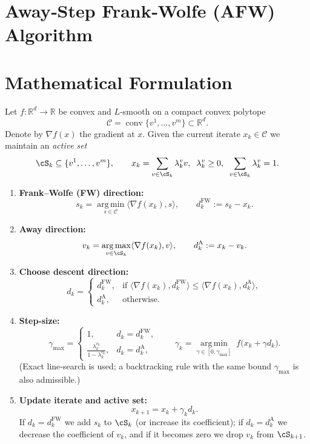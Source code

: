 \documentclass{article}
\newcommand{\R}{\mathbb{R}}
\newcommand{\cC}{\mathcal{C}}
\newcommand{\argmin}{\operatorname*{arg\,min}}
\newcommand{\argmax}{\operatorname*{arg\,max}}
\newcommand{\inner}[2]{\langle #1,#2\rangle}
\begin{document}
\section*{Away‑Step Frank‑Wolfe (AFW) Algorithm}

\section*{Mathematical Formulation}
Let $f:\R^{d}\rightarrow\R$ be convex and $L$‑smooth on a compact convex polytope 
\[
\cC=\operatorname{conv}\{v^{1},\dots ,v^{m}\}\subset\R^{d}.
\]
Denote by $\nabla f(x)$ the gradient at $x$.
Given the current iterate $x_{k}\in\cC$ we maintain an \emph{active set}
\[
\cS_{k}\subseteq\{v^{1},\dots ,v^{m}\},\qquad 
x_{k}= \sum_{v\in \cS_{k}} \lambda_{k}^{v} v,\;\; \lambda_{k}^{v}\ge 0,\;\; \sum_{v\in \cS_{k}}\lambda_{k}^{v}=1 .
\]

\begin{enumerate}[label=\arabic*.]
\item \textbf{Frank–Wolfe (FW) direction:}
\[
s_{k}= \argmin_{s\in\cC}\inner{\nabla f(x_{k})}{s},\qquad d_{k}^{\text{FW}}:= s_{k}-x_{k}.
\]
\item \textbf{Away direction:}
\[
v_{k}= \argmax_{v\in \cS_{k}}\inner{\nabla f(x_{k})}{v},\qquad 
d_{k}^{\text{A}}:= x_{k}-v_{k}.
\]
\item \textbf{Choose descent direction:}
\[
d_{k}= 
\begin{cases}
d_{k}^{\text{FW}}, & \text{if }\inner{\nabla f(x_{k})}{d_{k}^{\text{FW}}}\le 
\inner{\nabla f(x_{k})}{d_{k}^{\text{A}}},\\[4pt]
d_{k}^{\text{A}}, & \text{otherwise.}
\end{cases}
\]
\item \textbf{Step‑size:}
\[
\gamma_{\max }=
\begin{cases}
1, & d_{k}=d_{k}^{\text{FW}},\\[4pt]
\displaystyle\frac{\lambda_{k}^{v_{k}}}{1-\lambda_{k}^{v_{k}}}, & d_{k}=d_{k}^{\text{A}},
\end{cases}
\qquad 
\gamma_{k}= \argmin_{\gamma\in[0,\gamma_{\max}]}\; f\bigl(x_{k}+ \gamma d_{k}\bigr).
\]
(Exact line‑search is used; a backtracking rule with the same bound $\gamma_{\max}$ is also admissible.)
\item \textbf{Update iterate and active set:}
\[
x_{k+1}=x_{k}+ \gamma_{k} d_{k}.
\]
If $d_{k}=d_{k}^{\text{FW}}$ we add $s_{k}$ to $\cS_{k}$ (or increase its coefficient);
if $d_{k}=d_{k}^{\text{A}}$ we decrease the coefficient of $v_{k}$, and if it becomes zero we drop $v_{k}$ from $\cS_{k+1}$.
\end{enumerate}
\end{document}
